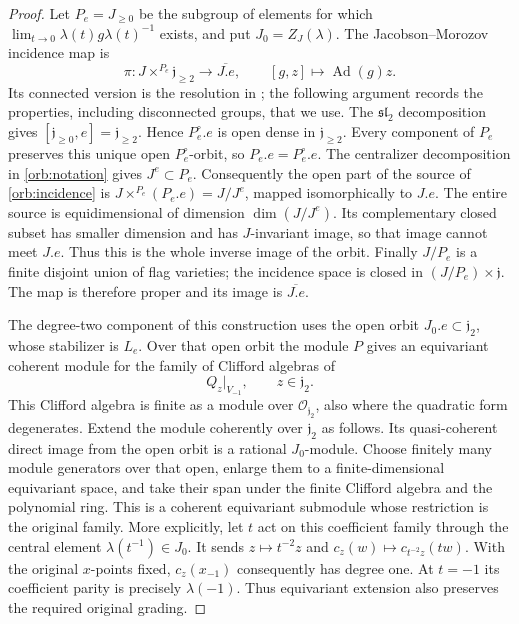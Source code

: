 \begin{proof}
Let $P_e=J_{\ge0}$ be the subgroup of elements for which
$\lim_{t\to0}\lambda(t)g\lambda(t)^{-1}$ exists, and put
$J_0=Z_J(\lambda)$.  The Jacobson--Morozov incidence map is
\begin{equation}\label{orb:incidence}
 \pi:J\times^{P_e}\mathfrak j_{\ge2}
                       \longrightarrow\overline{J.e},
 \qquad [g,z]\longmapsto\operatorname{Ad}(g)z.
\end{equation}
Its connected version is the resolution in
\cite[Section~2.3]{Namikawa}; the following argument records the
properties, including disconnected groups, that we use.
The $\mathfrak{sl}_2$ decomposition gives
$[\mathfrak j_{\ge0},e]=\mathfrak j_{\ge2}$.  Hence
$P_e^\circ.e$ is open dense in $\mathfrak j_{\ge2}$.  Every component
of $P_e$ preserves this unique open $P_e^\circ$-orbit, so
$P_e.e=P_e^\circ.e$.  The centralizer decomposition in
\eqref{orb:notation} gives $J^e\subset P_e$.
Consequently the open part of the source of \eqref{orb:incidence} is
$J\times^{P_e}(P_e.e)=J/J^e$, mapped isomorphically to $J.e$.
The entire source is equidimensional of dimension $\dim(J/J^e)$.
Its complementary closed subset has smaller dimension and has
$J$-invariant image, so that image cannot meet $J.e$.
Thus this is the whole inverse image of the orbit.
Finally $J/P_e$ is a finite disjoint union of flag varieties; the
incidence space is closed in $(J/P_e)\times\mathfrak j$.
The map is therefore proper and its image is $\overline{J.e}$.

The degree-two component of this construction uses the open orbit
$J_0.e\subset\mathfrak j_2$, whose stabilizer is $L_e$.
Over that open orbit the module $P$ gives an equivariant coherent module
for the family of Clifford algebras of
\[
 Q_z|_{V_{-1}},\qquad z\in\mathfrak j_2.
\]
This Clifford algebra is finite as a module over
$\mathcal O_{\mathfrak j_2}$, also where the quadratic form degenerates.
Extend the module coherently over $\mathfrak j_2$ as follows.  Its
quasi-coherent direct image from the open orbit is a rational
$J_0$-module.  Choose finitely many module generators over that open,
enlarge them to a finite-dimensional equivariant space, and take their
span under the finite Clifford algebra and the polynomial ring.
This is a coherent equivariant submodule whose restriction is the
original family.  More explicitly, let $t$ act on this coefficient
family through the central element $\lambda(t^{-1})\in J_0$.  It sends
$z\mapsto t^{-2}z$ and
$c_z(w)\mapsto c_{t^{-2}z}(tw)$.  With the original $x$-points fixed,
$c_z(x_{-1})$ consequently has degree one.  At $t=-1$ its coefficient
parity is precisely $\lambda(-1)$.  Thus equivariant extension also
preserves the required original grading.


\end{proof}
